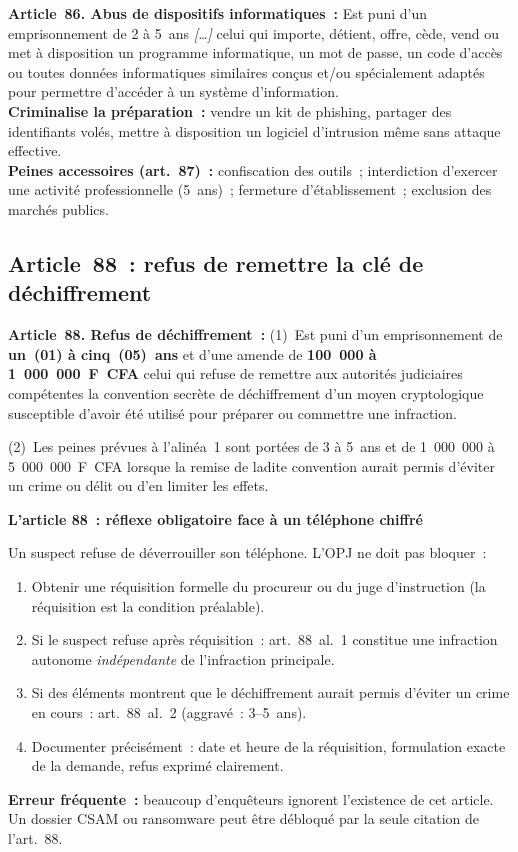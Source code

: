 \begin{boxjuris}
\textbf{Article~86. Abus de dispositifs informatiques~:}
Est puni d'un emprisonnement de 2 à 5~ans \textit{[\ldots]} celui qui
importe, détient, offre, cède, vend ou met à disposition un programme
informatique, un mot de passe, un code d'accès ou toutes données
informatiques similaires conçus et/ou spécialement adaptés pour permettre
d'accéder à un système d'information.\\[0.3ex]
\textbf{Criminalise la préparation~:} vendre un kit de phishing, partager
des identifiants volés, mettre à disposition un logiciel d'intrusion 
même sans attaque effective.\\[0.3ex]
\textbf{Peines accessoires (art.~87)~:} confiscation des outils~;
interdiction d'exercer une activité professionnelle (5~ans)~;
fermeture d'établissement~; exclusion des marchés publics.
\end{boxjuris}

\subsection{Article~88~: refus de remettre la clé de déchiffrement}

\begin{boxjuris}
\textbf{Article~88. Refus de déchiffrement~:}
(1)~Est puni d'un emprisonnement de \textbf{un~(01) à cinq~(05)~ans} et
d'une amende de \textbf{100~000 à 1~000~000~F~CFA} celui qui refuse de
remettre aux autorités judiciaires compétentes la convention secrète de
déchiffrement d'un moyen cryptologique susceptible d'avoir été utilisé
pour préparer ou commettre une infraction.

(2)~Les peines prévues à l'alinéa~1 sont portées de 3 à 5~ans et de
1~000~000 à 5~000~000~F~CFA lorsque la remise de ladite convention aurait
permis d'éviter un crime ou délit ou d'en limiter les effets.
\end{boxjuris}

\begin{boxPNC}
\textbf{L'article 88~: réflexe obligatoire face à un téléphone chiffré}

Un suspect refuse de déverrouiller son téléphone. L'OPJ ne doit pas bloquer~:
\begin{enumerate}
    \item Obtenir une réquisition formelle du procureur ou du juge
          d'instruction (la réquisition est la condition préalable).
    \item Si le suspect refuse après réquisition~: art.~88~al.~1
          constitue une infraction autonome \emph{indépendante} de
          l'infraction principale.
    \item Si des éléments montrent que le déchiffrement aurait permis
          d'éviter un crime en cours~: art.~88~al.~2 (aggravé~: 3--5~ans).
    \item Documenter précisément~: date et heure de la réquisition,
          formulation exacte de la demande, refus exprimé clairement.
\end{enumerate}
\textbf{Erreur fréquente~:} beaucoup d'enquêteurs ignorent l'existence
de cet article. Un dossier CSAM ou ransomware peut être débloqué par
la seule citation de l'art.~88.
\end{boxPNC}

